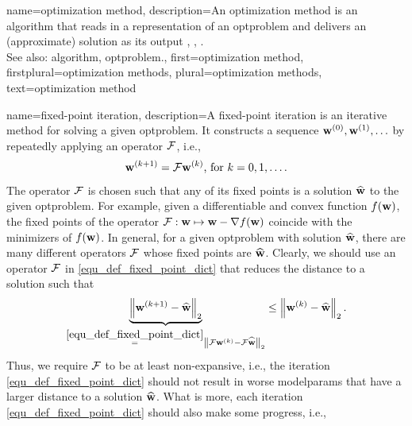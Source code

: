{name={optimization method},
	description={An optimization method is an \gls{algorithm} that 
		reads in a representation of an \gls{optproblem} and delivers an (approximate) solution 
		as its output \cite{BoydConvexBook}, \cite{nesterov04}, \cite{BertsekasNonLinProgr}.
		 \\
		 See also: \gls{algorithm}, \gls{optproblem}.},
	first={optimization method},
	firstplural={optimization methods}, 
	plural={optimization methods}, 
	text={optimization method}
}

{name={fixed-point iteration},
	description={A fixed-point iteration is an iterative method for solving 
		a given \gls{optproblem}. It constructs a sequence ${\bf w}^{(0)}, {\bf w}^{(1)},\ldots$ by 
		 repeatedly applying an operator $\mathcal{F}$, i.e., 
		 \begin{equation} 
		 	\label{equ_def_fixed_point_dict} 
		 	{\bf w}^{(k+1)} = \mathcal{F} {\bf w}^{(k)} \mbox{, for } k=0,1,\ldots.
		 \end{equation} 
		 The operator $\mathcal{F}$ is chosen such that any of its fixed points is a solution 
		 $\widehat{{\bf w}}$ to the given \gls{optproblem}. For example, given a \gls{differentiable} and 
		 \gls{convex} \gls{function} $f({\bf w})$, the fixed points of the operator $\mathcal{F}: {\bf w} \mapsto {\bf w} - \nabla f({\bf w})$ 
		 coincide with the minimizers of $f({\bf w})$. In general, for a given \gls{optproblem} with solution $\widehat{{\bf w}}$, 
		 there are many different operators $\mathcal{F}$ whose fixed points are $\widehat{{\bf w}}$. 
		 Clearly, we should use an operator $\mathcal{F}$ in \eqref{equ_def_fixed_point_dict} that reduces the distance to a solution such that
		 \begin{equation} 
			\nonumber
			\underbrace{\left\Vert { {\bf w}^{(k+1)} - \widehat{\mathbf{w}}} \right\Vert_{2}}_{\stackrel{\eqref{equ_def_fixed_point_dict}}{=} \left\Vert { \mathcal{F}{\bf w}^{(k)} - \mathcal{F}\widehat{{\bf w}}} \right\Vert_{2}}  \leq 	\left\Vert { {\bf w}^{(k)} - \widehat{{\bf w}}} \right\Vert_{2}. 
		\end{equation}
		Thus, we require $\mathcal{F}$ to be at least non-expansive, i.e., the iteration \eqref{equ_def_fixed_point_dict} 
		should not result in worse \gls{modelparams} that have a larger distance to a solution $\widehat{{\bf w}}$. 
		What is more, each iteration \eqref{equ_def_fixed_point_dict} should also make some progress, i.e., 
}}
